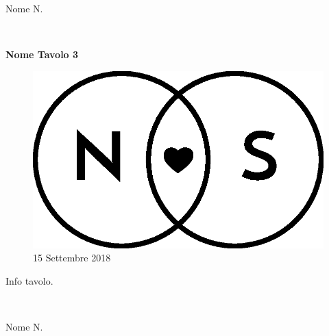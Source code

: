 \documentclass[20pt]{extarticle}
\begin{document}
\newpage
\begin{center}
\begin{minipage}[c][\textheight]{0.15\textwidth}
\raggedleft
{\Large Nome N.\\}
\end{minipage}%
\begin{minipage}[c][\textheight]{0.05\textwidth}
\raggedleft
{\ \\}
\end{minipage}%
\begin{minipage}[c][\textheight]{0.5\textwidth}
\centering
{\Huge \textbf{Nome Tavolo 3}}\par\bigskip
\vfill
\begin{figure}[H]
\centering
\includegraphics[scale=0.5]{img/Logo_piccolo.eps}
\vfill
\small15 Settembre 2018\\
\end{figure}
\vfill
Info tavolo.
\vfill
\end{minipage}%
\begin{minipage}[c][\textheight]{0.05\textwidth}
\raggedright
{\ \\}
\end{minipage}%
\begin{minipage}[c][\textheight]{0.15\textwidth}
\raggedright
{\Large Nome N.\\}
\end{minipage}
\end{center}
\end{document}
